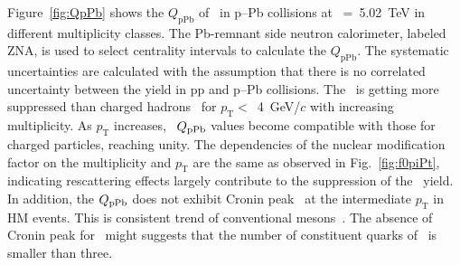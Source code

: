 Figure~\ref{fig:QpPb} shows the $Q_{\mbox{pPb}}$ of \fzero~in p--Pb collisions at \snn~=~5.02~TeV in different multiplicity classes. The Pb-remnant side neutron calorimeter, labeled ZNA, is used to select centrality intervals to calculate the $Q_{\mathrm{pPb}}$. The systematic uncertainties are calculated with the assumption that there is no correlated uncertainty between the yield in pp and p--Pb collisions. The \fzero~is getting more suppressed than charged hadrons~\cite{ALICE:2014xsp} for $p_{\mathrm{T}}<$~4~GeV/$c$ with increasing multiplicity. As $p_{\mathrm{T}}$ increases, \fzero~$Q_{\rm{pPb}}$ values become compatible with those for charged particles, reaching unity. The dependencies of the nuclear modification factor on the multiplicity and $p_{\mathrm{T}}$ are the same as observed in Fig.~\ref{fig:f0piPt}, indicating rescattering effects largely contribute to the suppression of the \fzero~yield. In addition, the $Q_{\rm{pPb}}$ does not exhibit Cronin peak~\cite{Cronin:1974zm} at the intermediate $p_{\mathrm{T}}$ in HM events. This is consistent trend of conventional mesons~\cite{ALICE:2016dei}. The absence of Cronin peak for \fzero~might suggests that the number of constituent quarks of \fzero~is smaller than three.